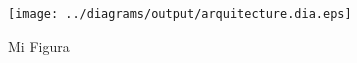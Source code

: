 \documentclass[12pt,letterpaper,oneside]{scrartcl}
\begin{document}

\tableofcontents


\begin{landscape}
\begin{figure}
 \centering
 \texttt{[image: ../diagrams/output/arquitecture.dia.eps]}
 \caption{Mi Figura}
 \label{fig:ejemplo}
\end{figure}
\end{landscape}


\end{document}
